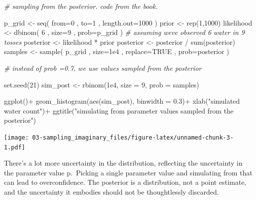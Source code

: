 \documentclass[
]{book}
\newenvironment{Shaded}{\begin{snugshade}}{\end{snugshade}}
\newcommand{\AttributeTok}[1]{\textcolor[rgb]{0.77,0.63,0.00}{#1}}
\newcommand{\CommentTok}[1]{\textcolor[rgb]{0.56,0.35,0.01}{\textit{#1}}}
\newcommand{\ConstantTok}[1]{\textcolor[rgb]{0.00,0.00,0.00}{#1}}
\newcommand{\DecValTok}[1]{\textcolor[rgb]{0.00,0.00,0.81}{#1}}
\newcommand{\FloatTok}[1]{\textcolor[rgb]{0.00,0.00,0.81}{#1}}
\newcommand{\FunctionTok}[1]{\textcolor[rgb]{0.00,0.00,0.00}{#1}}
\newcommand{\NormalTok}[1]{#1}
\newcommand{\OtherTok}[1]{\textcolor[rgb]{0.56,0.35,0.01}{#1}}
\newcommand{\SpecialCharTok}[1]{\textcolor[rgb]{0.00,0.00,0.00}{#1}}
\newcommand{\StringTok}[1]{\textcolor[rgb]{0.31,0.60,0.02}{#1}}
\begin{document}
\begin{Shaded}
\begin{Highlighting}[]
\CommentTok{\# sampling from the posterior. code from the book.}

\NormalTok{p\_grid }\OtherTok{\textless{}{-}} \FunctionTok{seq}\NormalTok{( }\AttributeTok{from=}\DecValTok{0}\NormalTok{ , }\AttributeTok{to=}\DecValTok{1}\NormalTok{ , }\AttributeTok{length.out=}\DecValTok{1000}\NormalTok{ ) }
\NormalTok{prior }\OtherTok{\textless{}{-}} \FunctionTok{rep}\NormalTok{(}\DecValTok{1}\NormalTok{,}\DecValTok{1000}\NormalTok{) }
\NormalTok{likelihood }\OtherTok{\textless{}{-}} \FunctionTok{dbinom}\NormalTok{( }\DecValTok{6}\NormalTok{ , }\AttributeTok{size=}\DecValTok{9}\NormalTok{ , }\AttributeTok{prob=}\NormalTok{p\_grid ) }\CommentTok{\# assuming we\textquotesingle{}ve observed 6 water in 9 tosses}
\NormalTok{posterior }\OtherTok{\textless{}{-}}\NormalTok{ likelihood }\SpecialCharTok{*}\NormalTok{ prior }
\NormalTok{posterior }\OtherTok{\textless{}{-}}\NormalTok{ posterior }\SpecialCharTok{/} \FunctionTok{sum}\NormalTok{(posterior)}
\NormalTok{samples }\OtherTok{\textless{}{-}} \FunctionTok{sample}\NormalTok{( p\_grid , }\AttributeTok{size=}\FloatTok{1e4}\NormalTok{ , }\AttributeTok{replace=}\ConstantTok{TRUE}\NormalTok{ , }\AttributeTok{prob=}\NormalTok{posterior )}

\CommentTok{\# instead of prob =0.7, we use values sampled from the posterior}

\FunctionTok{set.seed}\NormalTok{(}\DecValTok{21}\NormalTok{)}
\NormalTok{sim\_post }\OtherTok{\textless{}{-}} \FunctionTok{rbinom}\NormalTok{(}\FloatTok{1e4}\NormalTok{, }\AttributeTok{size =} \DecValTok{9}\NormalTok{, }\AttributeTok{prob =}\NormalTok{ samples)}

\FunctionTok{ggplot}\NormalTok{()}\SpecialCharTok{+}
  \FunctionTok{geom\_histogram}\NormalTok{(}\FunctionTok{aes}\NormalTok{(sim\_post), }\AttributeTok{binwidth =} \FloatTok{0.3}\NormalTok{)}\SpecialCharTok{+}
  \FunctionTok{xlab}\NormalTok{(}\StringTok{"simulated water count"}\NormalTok{)}\SpecialCharTok{+}
  \FunctionTok{ggtitle}\NormalTok{(}\StringTok{"simulating from parameter values sampled from the posterior"}\NormalTok{)}
\end{Highlighting}
\end{Shaded}

\texttt{[image: 03-sampling\_imaginary\_files/figure-latex/unnamed-chunk-3-1.pdf]}

There's a lot more uncertainty in the distribution, reflecting the uncertainty in the parameter value p.~Picking a single parameter value and simulating from that can lead to overconfidence. The posterior is a distribution, not a point estimate, and the uncertainty it embodies should not be thoughtlessly discarded.
\end{document}
